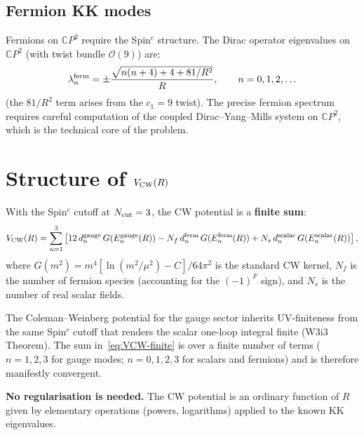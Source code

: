 \documentclass[11pt,a4paper]{article}
\newcommand{\CP}{\mathbb{C}P}
\newcounter{findingctr}
\newenvironment{finding}[1][]{%
  \refstepcounter{findingctr}%
  \begin{tcolorbox}[colback=blue!3!white, colframe=blue!50!black,
    title=\textbf{Finding \thefindingctr: #1}]
}{%
  \end{tcolorbox}%
}
\begin{document}
\subsection{Fermion KK modes}

Fermions on $\CP^2$ require the Spin$^c$ structure. The Dirac
operator eigenvalues on $\CP^2$ (with twist bundle
$\mathcal{O}(9)$) are:
\begin{equation}
\lambda_n^{\rm ferm} = \pm\frac{\sqrt{n(n+4) + 4 + 81/R^2}}{R},
\qquad n = 0, 1, 2, \ldots
\end{equation}
(the $81/R^2$ term arises from the $c_1 = 9$ twist). The precise
fermion spectrum requires careful computation of the coupled
Dirac--Yang--Mills system on $\CP^2$, which is the technical core
of the problem.


\section{Structure of $V_{\rm CW}(R)$}
\label{sec:VCW-structure}

With the Spin$^c$ cutoff at $N_{\rm cut} = 3$, the CW potential is
a \textbf{finite sum}:
\begin{equation}
V_{\rm CW}(R) = \sum_{n=1}^{3}\left[
12\,d_n^{\rm gauge}\,G(E_n^{\rm gauge}(R))
- N_f\,d_n^{\rm ferm}\,G(E_n^{\rm ferm}(R))
+ N_s\,d_n^{\rm scalar}\,G(E_n^{\rm scalar}(R))
\right],
\label{eq:VCW-finite}
\end{equation}
where $G(m^2) = m^4[\ln(m^2/\mu^2) - C]/64\pi^2$ is the standard
CW kernel, $N_f$ is the number of fermion species (accounting for
the $(-1)^F$ sign), and $N_s$ is the number of real scalar fields.

\begin{finding}[CW Potential Is UV-Finite by the Same Mechanism]
\label{find:CW-finite}
The Coleman--Weinberg potential for the gauge sector inherits
UV-finiteness from the same Spin$^c$ cutoff that renders the
scalar one-loop integral finite (W3i3 Theorem). The sum
in~\eqref{eq:VCW-finite} is over a finite number of terms
($n = 1,2,3$ for gauge modes; $n = 0,1,2,3$ for scalars and
fermions) and is therefore manifestly convergent.

\textbf{No regularisation is needed.} The CW potential is an
ordinary function of $R$ given by elementary operations (powers,
logarithms) applied to the known KK eigenvalues.
\end{finding}
\end{document}
